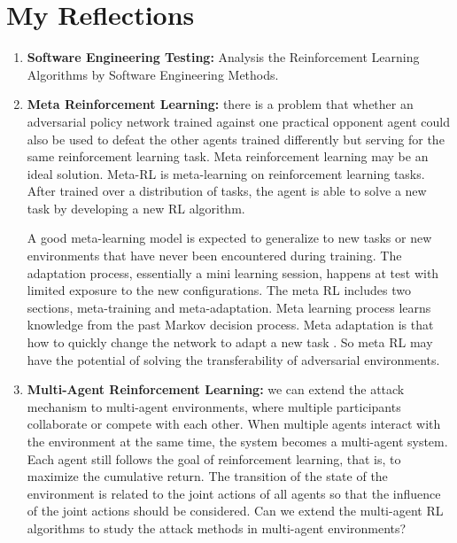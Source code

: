 \documentclass[a4paper]{article}
\begin{document}
\section{My Reflections}
\begin{enumerate}
    \item \textbf{Software Engineering Testing:} Analysis the Reinforcement Learning Algorithms by Software Engineering Methods.
    \item \textbf{Meta Reinforcement Learning: }there is a problem that whether an adversarial policy network trained against one practical opponent agent could also be used to defeat the other agents trained differently but serving for the same reinforcement learning task. 
    Meta reinforcement learning may be an ideal solution. Meta-RL is meta-learning on reinforcement learning tasks. After trained over a distribution of tasks, the agent is able to solve a new task by developing a new RL algorithm.
    
    A good meta-learning model is expected to generalize to new tasks or new environments that have never been encountered during training. 
    The adaptation process, essentially a mini learning session, happens at test with limited exposure to the new configurations.
    The meta RL includes two sections, meta-training and meta-adaptation. Meta learning process learns knowledge from the past Markov decision process.
    Meta adaptation is that how to quickly change the network to adapt a new task \cite{wang2016learning}. So meta RL may have the potential of solving the transferability of adversarial environments.
    
    \item \textbf{Multi-Agent Reinforcement Learning: }we can extend the attack mechanism to multi-agent environments, where multiple participants collaborate or compete with each other.
    When multiple agents interact with the environment at the same time, the system becomes a multi-agent system. Each agent still follows the goal of reinforcement learning, that is, to maximize the cumulative return. 
    The transition of the state of the environment is related to the joint actions of all agents so that the influence of the joint actions should be considered.
    Can we extend the multi-agent RL algorithms to study the attack methods in multi-agent environments?
\end{enumerate}

\clearpage


\end{document}
